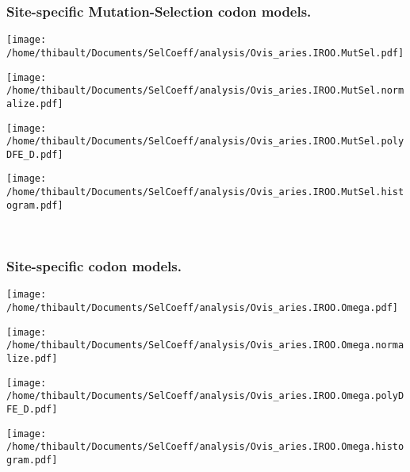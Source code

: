 \subsubsection*{Site-specific Mutation-Selection codon models.} 
\begin{minipage}{0.49\linewidth} 
\texttt{[image: /home/thibault/Documents/SelCoeff/analysis/Ovis\_aries.IROO.MutSel.pdf]} 
\end{minipage}
\begin{minipage}{0.49\linewidth} 
\texttt{[image: /home/thibault/Documents/SelCoeff/analysis/Ovis\_aries.IROO.MutSel.normalize.pdf]} 
\end{minipage}
\begin{minipage}{0.49\linewidth} 
\texttt{[image: /home/thibault/Documents/SelCoeff/analysis/Ovis\_aries.IROO.MutSel.polyDFE\_D.pdf]} 
\end{minipage}
\begin{minipage}{0.49\linewidth} 
\texttt{[image: /home/thibault/Documents/SelCoeff/analysis/Ovis\_aries.IROO.MutSel.histogram.pdf]} 
\end{minipage}
\\ 
\subsubsection*{Site-specific codon models.} 
\begin{minipage}{0.49\linewidth} 
\texttt{[image: /home/thibault/Documents/SelCoeff/analysis/Ovis\_aries.IROO.Omega.pdf]} 
\end{minipage}
\begin{minipage}{0.49\linewidth} 
\texttt{[image: /home/thibault/Documents/SelCoeff/analysis/Ovis\_aries.IROO.Omega.normalize.pdf]} 
\end{minipage}
\begin{minipage}{0.49\linewidth} 
\texttt{[image: /home/thibault/Documents/SelCoeff/analysis/Ovis\_aries.IROO.Omega.polyDFE\_D.pdf]} 
\end{minipage}
\begin{minipage}{0.49\linewidth} 
\texttt{[image: /home/thibault/Documents/SelCoeff/analysis/Ovis\_aries.IROO.Omega.histogram.pdf]} 
\end{minipage}
\\ 
